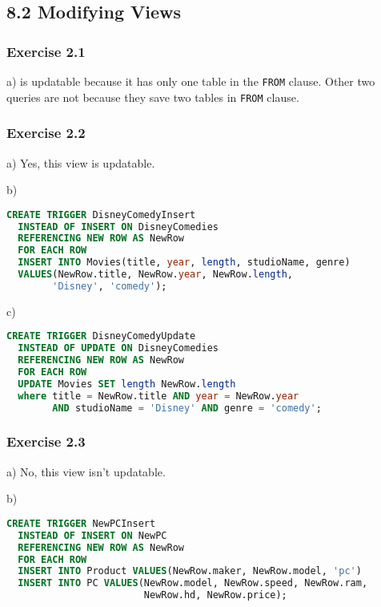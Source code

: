 \documentclass[../../main.tex]{subfiles}
\begin{document}
\subsection{8.2 Modifying Views}

\subsubsection*{Exercise 2.1}

a) is updatable because it has only one table in the \verb|FROM|
clause. Other two queries are not because they save two
tables in \verb|FROM| clause.

\subsubsection*{Exercise 2.2}

a) Yes, this view is updatable.

b)

\begin{lstlisting}[language=sql]
  CREATE TRIGGER DisneyComedyInsert
  INSTEAD OF INSERT ON DisneyComedies
  REFERENCING NEW ROW AS NewRow
  FOR EACH ROW
  INSERT INTO Movies(title, year, length, studioName, genre)
  VALUES(NewRow.title, NewRow.year, NewRow.length,
        'Disney', 'comedy');
\end{lstlisting}

c)

\begin{lstlisting}[language=sql]
  CREATE TRIGGER DisneyComedyUpdate
  INSTEAD OF UPDATE ON DisneyComedies
  REFERENCING NEW ROW AS NewRow
  FOR EACH ROW
  UPDATE Movies SET length NewRow.length
  where title = NewRow.title AND year = NewRow.year
        AND studioName = 'Disney' AND genre = 'comedy';
\end{lstlisting}

\subsubsection*{Exercise 2.3}

a) No, this view isn't updatable.

b)

\begin{lstlisting}[language=sql]
  CREATE TRIGGER NewPCInsert
  INSTEAD OF INSERT ON NewPC
  REFERENCING NEW ROW AS NewRow
  FOR EACH ROW
  INSERT INTO Product VALUES(NewRow.maker, NewRow.model, 'pc')
  INSERT INTO PC VALUES(NewRow.model, NewRow.speed, NewRow.ram,
                        NewRow.hd, NewRow.price);
\end{lstlisting}
\end{document}
